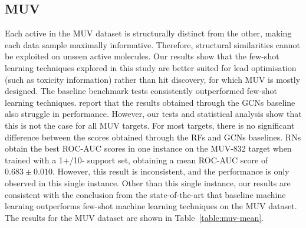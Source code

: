 \documentclass[journal=jcisd8,manuscript=article]{achemso} %
\begin{document}
\subsection{MUV}

Each active in the MUV dataset is structurally distinct from the other, making each data sample maximally informative. Therefore, structural similarities cannot be exploited on unseen active molecules. Our results show that the few-shot learning techniques explored in this study are better suited for lead optimisation (such as toxicity information) rather than hit discovery, for which MUV is mostly designed. The baseline benchmark tests consistently outperformed few-shot learning techniques. \citet{altae2017low} report that the results obtained through the GCNs baseline also struggle in performance. However, our tests and statistical analysis show that this is not the case for all MUV targets. For most targets, there is no significant difference between the scores obtained through the RFs and GCNs baselines. RNs obtain the best ROC-AUC scores in one instance on the MUV-832 target when trained with a 1+/10- support set, obtaining a mean ROC-AUC score of $0.683 \pm 0.010$. However, this result is inconsistent, and the performance is only observed in this single instance. Other than this single instance, our results are consistent with the conclusion from the state-of-the-art that baseline machine learning outperforms few-shot machine learning techniques on the MUV dataset. The results for the MUV dataset are shown in Table~\ref{table:muv-mean}. 
\end{document}

